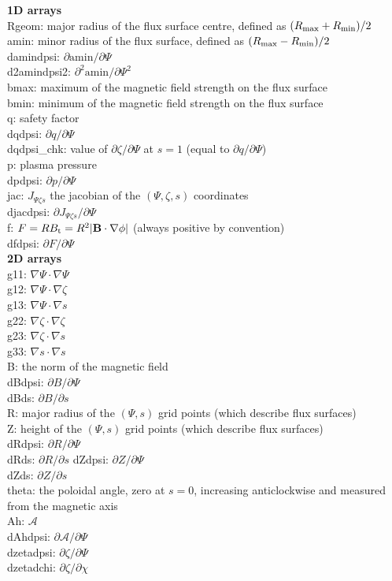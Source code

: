 \documentclass[a4paper,12pt]{article}
\newcommand{\ind}[1]{\ensuremath{_{\rm{#1}}}}
\begin{document}
\textbf{1D arrays}\\
Rgeom: major radius of the flux surface centre, defined as $(R\ind{max}+R\ind{min})/2$\\
amin: minor radius of the flux surface, defined as $(R\ind{max}-R\ind{min})/2$\\
damindpsi: $\partial \mathrm{amin}/\partial \Psi$\\
d2amindpsi2: $\partial^2 \mathrm{amin}/\partial \Psi^2$\\
bmax: maximum of the magnetic field strength on the flux surface\\
bmin: minimum of the magnetic field strength on the flux surface\\
q: safety factor\\
dqdpsi: $\partial q /\partial \Psi$\\
dqdpsi\_chk: value of $\partial \zeta / \partial \Psi$ at $s=1$ (equal to $\partial q /\partial \Psi$)\\
p: plasma pressure\\
dpdpsi: $\partial p /\partial \Psi$\\
jac: $J_{\Psi\zeta s}$ the jacobian of the $(\Psi,\zeta,s)$ coordinates\\
djacdpsi: $\partial J_{\Psi\zeta s} /\partial \Psi$\\
f: $F=RB\ind{t} = R^2|\mathbf{B}\cdot\nabla\phi|$ (always positive by convention)\\
dfdpsi: $\partial F /\partial \Psi$\\

\textbf{2D arrays}\\
g11: $\nabla \Psi \cdot \nabla \Psi$\\
g12: $\nabla \Psi \cdot \nabla \zeta$\\
g13: $\nabla \Psi \cdot \nabla s$\\
g22: $\nabla \zeta \cdot \nabla \zeta$\\
g23: $\nabla \zeta \cdot \nabla s$\\
g33: $\nabla s \cdot \nabla s$\\
B: the norm of the magnetic field\\
dBdpsi: $\partial B/\partial \Psi$\\
dBds: $\partial B/\partial s$\\
R: major radius of the $(\Psi,s)$ grid points (which describe flux surfaces) \\
Z: height of the $(\Psi,s)$ grid points (which describe flux surfaces) \\
dRdpsi: $\partial R/\partial \Psi$\\
dRds: $\partial R/\partial s$
dZdpsi: $\partial Z/\partial \Psi$\\
dZds: $\partial Z/\partial s$\\
theta: the poloidal angle, zero at $s=0$, increasing anticlockwise and measured from the magnetic axis\\
Ah: $\mathcal{A}$ \\
dAhdpsi: $\partial \mathcal{A}/\partial \Psi$\\ 
dzetadpsi: $\partial \zeta/\partial \Psi$\\ 
dzetadchi: $\partial \zeta/\partial \chi$\\ 
\end{document}
